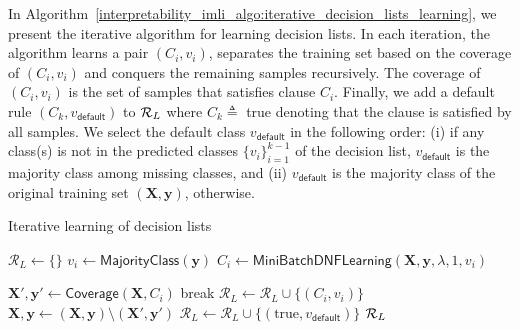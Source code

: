 In Algorithm~\ref{interpretability_imli_algo:iterative_decision_lists_learning}, we present the iterative algorithm for learning decision lists.  In each iteration, the algorithm learns a pair $ (C_i, v_i) $, separates the training set based on the coverage of $ (C_i, v_i) $ and conquers the remaining samples recursively. The coverage of $ (C_i, v_i) $ is the set of samples that satisfies clause $ C_i $. Finally, we add a default rule $ (C_k, v_\mathsf{default}) $ to $ {\mathcal{R}}_L $ where $ C_k \triangleq  $ true denoting that the clause is satisfied by all samples. We select the default class $ v_\mathsf{default} $ in the following order: (i) if any class(s) is not in the predicted classes $ \{v_i\}_{i=1}^{k-1} $ of the decision list, 
 $ v_{\mathsf{default}} $ is the majority class among missing classes, and (ii)  $ v_{\mathsf{default}} $ is the majority class of the original training set $ (\mathbf{X}, \mathbf{y}) $, otherwise. 


\begin{algorithm}
	\caption{Iterative learning of decision lists}
	\label{interpretability_imli_algo:iterative_decision_lists_learning}
	\begin{algorithmic}[1]
		\State $ \mathcal{R}_L \leftarrow \{\}$
		\State $ v_i \leftarrow \mathsf{MajorityClass(\mathbf{y})} $ 
		\State $ C_i \leftarrow \mathsf{MiniBatchDNFLearning}( \mathbf{X},\mathbf{y},\lambda, 1, v_i) $ 
		
		\State $ \mathbf{X}',\mathbf{y}' \leftarrow \mathsf{Coverage}(\mathbf{X}, C_i) $
		\State break
		\EndIf
		\State $ \mathcal{R}_L \leftarrow \mathcal{R}_L \cup \{(C_i, v_i)\} $
		\State $ \mathbf{X},\mathbf{y}  \leftarrow (\mathbf{X},\mathbf{y})  \setminus (\mathbf{X}',\mathbf{y}') $ 
		\EndFor
		\State $ \mathcal{R}_L \leftarrow \mathcal{R}_L  \cup \{(\text{true}, v_{\mathsf{default}} )\}$	
		\State \Return $ {\mathcal{R}}_L $
		\EndProcedure
	\end{algorithmic}
	
\end{algorithm}

